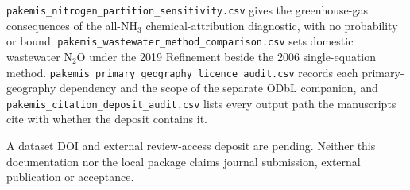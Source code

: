 \documentclass[essd]{copernicus}
\begin{document}
\texttt{pakemis\_\allowbreak nitrogen\_\allowbreak partition\_\allowbreak sensitivity.csv} gives the greenhouse-gas consequences of the all-NH$_3$ chemical-attribution diagnostic, with no probability or bound. \texttt{pakemis\_\allowbreak wastewater\_\allowbreak method\_\allowbreak comparison.csv} sets domestic wastewater N$_2$O under the 2019 Refinement beside the 2006 single-equation method. \texttt{pakemis\_\allowbreak primary\_\allowbreak geography\_\allowbreak licence\_\allowbreak audit.csv} records each primary-geography dependency and the scope of the separate ODbL companion, and \texttt{pakemis\_\allowbreak citation\_\allowbreak deposit\_\allowbreak audit.csv} lists every output path the manuscripts cite with whether the deposit contains it.

A dataset DOI and external review-access deposit are pending. Neither this documentation nor the local package claims journal submission, external publication or acceptance.

\appendix



\ReleaseCover
\end{document}
